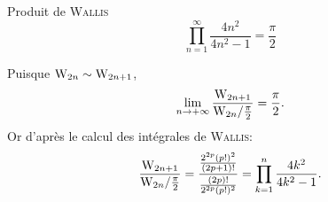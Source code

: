 \begin{prop}{Produit de \textsc{Wallis}}
    $$\prod_{n=1}^{\infty} \frac{4n^2}{4n^2-1} = \frac{\pi}{2}$$
\end{prop}

\begin{preuve}
    Puisque $\mathrm{W}_{2n} \sim \mathrm{W}_{2n+1}$, 
    $$\lim_{n \to +\infty} \frac{\mathrm{W}_{2n+1}}{\mathrm{W}_{2n} / \frac{\pi}{2}} = \frac{\pi}{2}.$$
    Or d'après le calcul des intégrales de \textsc{Wallis}:
    $$\frac{\mathrm{W}_{2n+1}}{\mathrm{W}_{2n} / \frac{\pi}{2}} = \frac{\frac{2^{2p}(p!)^2}{(2p+1)!}}{\frac{(2p)!}{2^{2p}(p!)^2}} = \prod_{k=1}^n \frac{4k^2}{4k^2-1}.$$
\end{preuve}